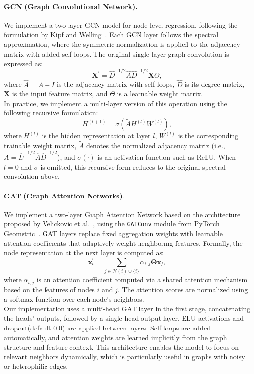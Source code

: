 \documentclass[runningheads]{llncs}
\begin{document}
\paragraph{GCN (Graph Convolutional Network).}
We implement a two-layer GCN model for node-level regression, following the formulation by Kipf and Welling~\cite{kipf2016semi}. Each GCN layer follows the spectral approximation, where the symmetric normalization is applied to the adjacency matrix with added self-loops. The original single-layer graph convolution is expressed as:
\[
\mathbf{X}^{\prime} = \hat{D}^{-1/2} \hat{A} \hat{D}^{-1/2} \mathbf{X} \Theta,
\]
where $\hat{A} = A + I$ is the adjacency matrix with self-loops, $\hat{D}$ is its degree matrix, $\mathbf{X}$ is the input feature matrix, and $\Theta$ is a learnable weight matrix.\\
In practice, we implement a multi-layer version of this operation using the following recursive formulation:
\[
H^{(l+1)} = \sigma\left( \tilde{A} H^{(l)} W^{(l)} \right),
\]
where $H^{(l)}$ is the hidden representation at layer $l$, $W^{(l)}$ is the corresponding trainable weight matrix, $\tilde{A}$ denotes the normalized adjacency matrix (i.e., $\tilde{A} = \hat{D}^{-1/2} \hat{A} \hat{D}^{-1/2}$), and $\sigma(\cdot)$ is an activation function such as ReLU. When $l=0$ and $\sigma$ is omitted, this recursive form reduces to the original spectral convolution above.


\paragraph{GAT (Graph Attention Networks).}
We implement a two-layer Graph Attention Network based on the architecture proposed by Velickovic et al.~\cite{velivckovic2017graph}, using the \texttt{GATConv} module from PyTorch Geometric~\cite{rozemberczki2021pytorch}. GAT layers replace fixed aggregation weights with learnable attention coefficients that adaptively weight neighboring features. Formally, the node representation at the next layer is computed as:
\[
\mathbf{x}^{\prime}_i = \sum_{j \in \mathcal{N}(i) \cup \{ i \}} \alpha_{i,j} \mathbf{\Theta} \mathbf{x}_{j},
\]
where $\alpha_{i,j}$ is an attention coefficient computed via a shared attention mechanism based on the features of nodes $i$ and $j$. The attention scores are normalized using a softmax function over each node's neighbors.\\
Our implementation uses a multi-head GAT layer in the first stage, concatenating the heads' outputs, followed by a single-head output layer. ELU activations and dropout(default 0.0) are applied between layers. Self-loops are added automatically, and attention weights are learned implicitly from the graph structure and feature context. This architecture enables the model to focus on relevant neighbors dynamically, which is particularly useful in graphs with noisy or heterophilic edges.
\end{document}
